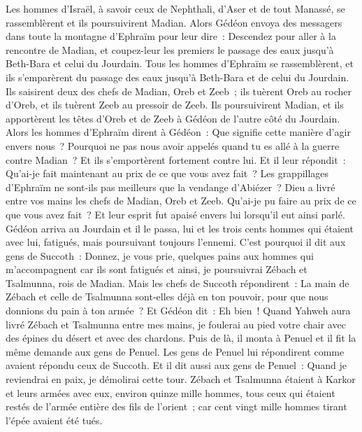 \begin{multicols}{2}
Les hommes d'Israël, à savoir ceux de Nephthali, d'Aser et de tout Manassé, se rassemblèrent et ils poursuivirent Madian.
Alors Gédéon envoya des messagers dans toute la montagne d'Ephraïm pour leur dire~: Descendez pour aller à la rencontre de Madian, et coupez-leur les premiers le passage des eaux jusqu'à Beth-Bara et celui du Jourdain. Tous les hommes d'Ephraïm se rassemblèrent, et ils s'emparèrent du passage des eaux jusqu'à Beth-Bara et de celui du Jourdain.
Ils saisirent deux des chefs de Madian, Oreb et Zeeb~; ils tuèrent Oreb au rocher d'Oreb, et ils tuèrent Zeeb au pressoir de Zeeb. Ils poursuivirent Madian, et ils apportèrent les têtes d'Oreb et de Zeeb à Gédéon de l'autre côté du Jourdain.
\VerseOne{}Alors les hommes d'Ephraïm dirent à Gédéon~: Que signifie cette manière d'agir envers nous~? Pourquoi ne pas nous avoir appelés quand tu es allé à la guerre contre Madian~? Et ils s'emportèrent fortement contre lui.
Et il leur répondit~: Qu'ai-je fait maintenant au prix de ce que vous avez fait~? Les grappillages d'Ephraïm ne sont-ils pas meilleurs que la vendange d'Abiézer~?
Dieu a livré entre vos mains les chefs de Madian, Oreb et Zeeb. Qu'ai-je pu faire au prix de ce que vous avez fait~? Et leur esprit fut apaisé envers lui lorsqu'il eut ainsi parlé.
Gédéon arriva au Jourdain et il le passa, lui et les trois cents hommes qui étaient avec lui, fatigués, mais poursuivant toujours l'ennemi.
C'est pourquoi il dit aux gens de Succoth~: Donnez, je vous prie, quelques pains aux hommes qui m'accompagnent car ils sont fatigués et ainsi, je poursuivrai Zébach et Tsalmunna, rois de Madian.
Mais les chefs de Succoth répondirent~: La main de Zébach et celle de Tsalmunna sont-elles déjà en ton pouvoir, pour que nous donnions du pain à ton armée~?
Et Gédéon dit~: Eh bien~! Quand Yahweh aura livré Zébach et Tsalmunna entre mes mains, je foulerai au pied votre chair avec des épines du désert et avec des chardons.
Puis de là, il monta à Penuel et il fit la même demande aux gens de Penuel. Les gens de Penuel lui répondirent comme avaient répondu ceux de Succoth.
Et il dit aussi aux gens de Penuel~: Quand je reviendrai en paix, je démolirai cette tour.
Zébach et Tsalmunna étaient à Karkor et leurs armées avec eux, environ quinze mille hommes, tous ceux qui étaient restés de l'armée entière des fils de l'orient~; car cent vingt mille hommes tirant l'épée avaient été tués.

\end{multicols}
